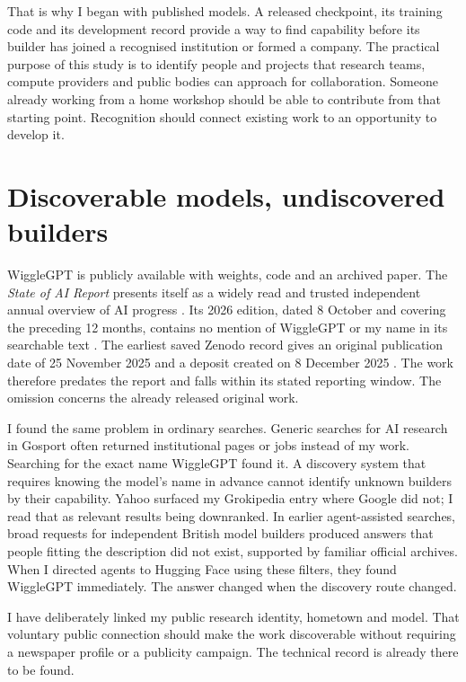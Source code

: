 \documentclass[11pt,a4paper]{article}
\begin{document}
That is why I began with published models. A released checkpoint, its
training code and its development record provide a way to find capability
before its builder has joined a recognised institution or formed a company.
The practical purpose of this study is to identify people and projects that
research teams, compute providers and public bodies can approach for
collaboration. Someone already working from a home workshop should be able
to contribute from that starting point. Recognition should connect existing
work to an opportunity to develop it.





\section{Discoverable models, undiscovered builders}
WiggleGPT is publicly available with weights, code and an archived paper.
The \emph{State of AI Report} presents itself as a widely read and trusted
independent annual overview of AI progress \cite{stateofaiabout}.
Its 2026 edition, dated 8 October and covering the preceding
12 months, contains no mention of WiggleGPT or my name in its searchable
text \cite{stateofai2026}. The earliest saved Zenodo record gives an original
publication date of 25 November 2025 and a deposit created on 8 December
2025 \cite{wiggleoriginal}. The work therefore predates the report and falls
within its stated reporting window. The omission concerns the already
released original work.

I found the same problem in ordinary searches. Generic searches for AI
research in Gosport often returned institutional pages or jobs instead of
my work. Searching for the exact name WiggleGPT found it. A discovery
system that requires knowing the model's name in advance cannot identify
unknown builders by their capability. Yahoo surfaced my Grokipedia entry
where Google did not; I read
that as relevant results being downranked. In earlier agent-assisted
searches, broad requests for independent British model builders produced
answers that people fitting the description did not exist, supported by
familiar official archives. When I directed agents to Hugging Face using
these filters, they found WiggleGPT immediately. The answer changed when
the discovery route changed.

I have deliberately linked my public research identity, hometown and
model. That voluntary public connection should make the work discoverable
without requiring a newspaper profile or a publicity campaign. The
technical record is already there to be found.
\end{document}

